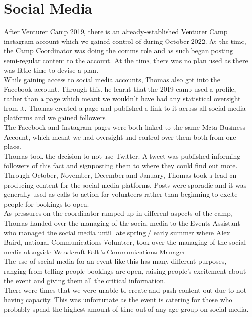 \section{Social Media}
After Venturer Camp 2019, there is an already-established Venturer Camp instagram account which we gained control of during October 2022. At the time, the Camp Coordinator was doing the comms role and as such began posting semi-regular content to the account. At the time, there was no plan used as there was little time to devise a plan.\\

While gaining access to social media accounts, Thomas also got into the Facebook account. Through this, he learnt that the 2019 camp used a profile, rather than a page which meant we wouldn't have had any statistical oversight from it. Thomas created a page and published a link to it across all social media platforms and we gained followers.\\

The Facebook and Instagram pages were both linked to the same Meta Business Account, which meant we had oversight and control over them both from one place.\\

Thomas took the decision to not use Twitter. A tweet was published informing followers of this fact and signposting them to where they could find out more.\\

Through October, November, December and January, Thomas took a lead on producing content for the social media platforms. Posts were sporadic and it was generally used as calls to action for volunteers rather than beginning to excite people for bookings to open. \\

As pressures on the coordinator ramped up in different aspects of the camp, Thomas handed over the managing of the social media to the Events Assistant who managed the social media until late spring / early summer where Alex Baird, national Communications Volunteer,  took over the managing of the social media alongside Woodcraft Folk's Communications Manager. \\

The use of social media for an event like this has many different purposes, ranging from telling people bookings are open, raising people's excitement about the event and giving them all the critical information.\\

There were times that we were unable to create and push content out due to not having capacity. This was unfortunate as the event is catering for those who probably spend the highest amount of time out of any age group on social media.\\


